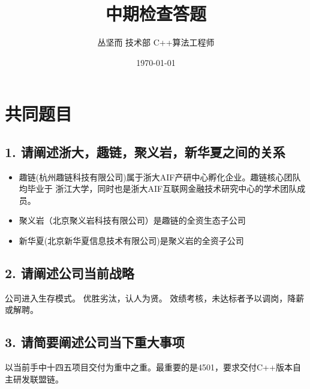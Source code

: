 \documentclass[dvipsnames]{ctexart}
\title{中期检查答题}
\date{\today}
\author{丛坚而 技术部 C++算法工程师}
\begin{document}
\maketitle{}

\section*{共同题目}

\subsection*{1. 请阐述浙大，趣链，聚义岩，新华夏之间的关系}

\begin{itemize}
\item 趣链(杭州趣链科技有限公司)属于浙大AIF产研中心孵化企业。趣链核心团队均毕业于
  浙江大学，同时也是浙大AIF互联网金融技术研究中心的学术团队成员。
\item 聚义岩（北京聚义岩科技有限公司）是趣链的全资生态子公司
\item 新华夏(北京新华夏信息技术有限公司)是聚义岩的全资子公司
\end{itemize}

\subsection*{2. 请阐述公司当前战略}
公司进入生存模式。
优胜劣汰，认人为贤。
效绩考核，未达标者予以调岗，降薪或解聘。


\subsection*{3. 请简要阐述公司当下重大事项}
以当前手中十四五项目交付为重中之重。最重要的是4501，要求交付C++版本自主研发联盟链。
\end{document}
